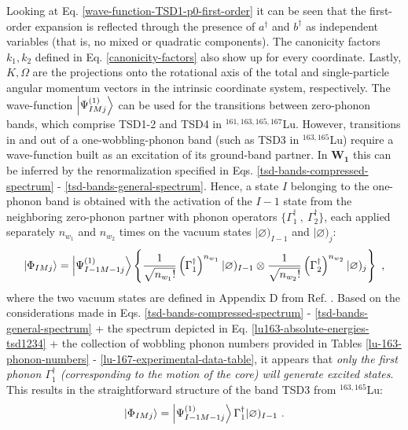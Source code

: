 Looking at Eq. \ref{wave-function-TSD1-p0-first-order} it can be seen that the first-order expansion is reflected through the presence of $a^\dagger$ and $b^\dagger$ as independent variables (that is, no mixed or quadratic components). The canonicity factors $k_1,k_2$ defined in Eq. \ref{canonicity-factors} also show up for every coordinate. Lastly, $K,\Omega$ are the projections onto the rotational axis of the total and single-particle angular momentum vectors in the intrinsic coordinate system, respectively.
The wave-function $\ket{\Psi_{IMj}^{(1)}}$ can be used for the transitions between zero-phonon bands, which comprise TSD1-2 and TSD4 in $^{161,163,165,167}$Lu. However, transitions in and out of a one-wobbling-phonon band (such as TSD3 in $^{163,165}$Lu) require a wave-function built as an excitation of its ground-band partner. In $\mathbf{W_1}$ this can be inferred by the renormalization specified in Eqs. \ref{tsd-bands-compressed-spectrum} - \ref{tsd-bands-general-spectrum}. Hence, a state $I$ belonging to the one-phonon band is obtained with the activation of the $I-1$ state from the neighboring zero-phonon partner with phonon operators $\{\Gamma_1^\dagger\ ,\ \Gamma_2^\dagger\}$, each applied separately $n_{w_1}$ and $n_{w_2}$ times on the vacuum states $|\varnothing)_{I-1}$ and $|\varnothing)_j$:
\begin{align}
    \ket{\Phi_{IMj}}=\ket{\Psi_{I-1M-1j}^{(1)}}\left\{\frac{1}{\sqrt{n_{w_1}!}}\left(\Gamma_1^\dagger\right)^{n_{w_1}}|\varnothing)_{I-1}\otimes\frac{1}{\sqrt{n_{w_2}!}}\left(\Gamma_2^\dagger\right)^{n_{w_2}}|\varnothing)_j\right\}\ ,
    \label{wave-function-TSD-excited-phonon-state}
\end{align}
where the two vacuum states are defined in Appendix D from Ref. \cite{raduta2017semiclassical}. Based on the considerations made in Eqs. \ref{tsd-bands-compressed-spectrum} - \ref{tsd-bands-general-spectrum} + the spectrum depicted in Eq. \ref{lu163-absolute-energies-tsd1234} + the collection of wobbling phonon numbers provided in Tables \ref{lu-163-phonon-numbers} - \ref{lu-167-experimental-data-table}, it appears that \emph{only the first phonon $\Gamma_1^\dagger$ (corresponding to the motion of the core) will generate excited states}. This results in the straightforward structure of the band TSD3 from $^{163,165}$Lu:
\begin{align}
    \ket{\Phi_{IMj}}=\ket{\Psi_{I-1M-1j}^{(1)}}\Gamma_1^\dagger|\varnothing)_{I-1}\ .
    \label{wave-function-TSD3}
\end{align}

